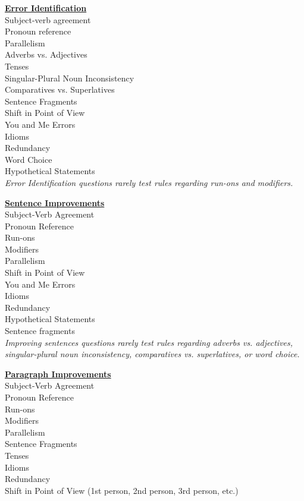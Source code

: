 \documentclass[12pt]{book}
\begin{document}
\bigskip
\begin{center}
\textbf{\underline{Error Identification}}\\

\bigskip
Subject-verb agreement\\
Pronoun reference\\
Parallelism\\
Adverbs vs. Adjectives\\
Tenses\\
Singular-Plural Noun Inconsistency\\
Comparatives vs. Superlatives\\
Sentence Fragments\\
Shift in Point of View\\
You and Me Errors\\
Idioms\\
Redundancy\\
Word Choice\\
Hypothetical Statements\\

\bigskip
\textit{Error Identification questions rarely test rules regarding run-ons and modifiers.}

\bigskip

\textbf{\underline{Sentence Improvements}}\\

\bigskip
Subject-Verb Agreement\\
Pronoun Reference\\
Run-ons\\
Modifiers\\
Parallelism\\
Shift in Point of View\\
You and Me Errors\\
Idioms\\
Redundancy\\
Hypothetical Statements\\
Sentence fragments\\

\bigskip
\textit{Improving sentences questions rarely test rules regarding adverbs vs. adjectives, singular-plural noun inconsistency, comparatives vs. superlatives, or word choice.} 

\bigskip
\textbf{\underline{Paragraph Improvements}}\\
\bigskip
Subject-Verb Agreement\\
Pronoun Reference\\
Run-ons\\
Modifiers\\
Parallelism\\
Sentence Fragments\\
Tenses\\
Idioms\\
Redundancy\\
Shift in Point of View (1st person, 2nd person, 3rd person, etc.)\\


\end{center}
\end{document}
